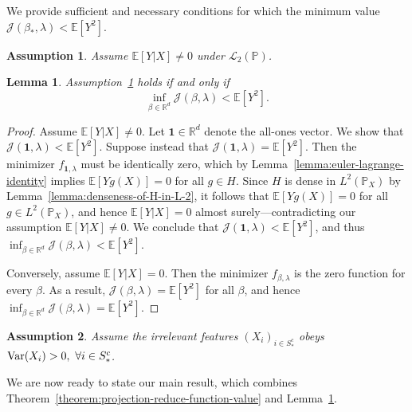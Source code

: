 \documentclass[sn-mathphys-num]{sn-jnl}%
\numberwithin{equation}{section}
\newcommand{\R}{\mathbb{R}}
\newcommand{\E}{\mathbb{E}}
\renewcommand{\P}{\mathbb{P}}
\newtheorem{lemma}{Lemma}
\newtheorem{assumption}{Assumption}[section]
\newcommand{\Var}{{\rm Var}}
\theoremstyle{thmstyleone}%
\theoremstyle{thmstyletwo}%
\theoremstyle{thmstylethree}%
\begin{document}
We provide sufficient and necessary conditions for which the minimum value $\mathcal{J}(\beta_*, \lambda) < \E[Y^2]$. 

\vspace{.5em} 
\begin{assumption}
\label{assumption:for-the-global-minimizer}
Assume $\E[Y|X] \neq 0$ under $\mathcal{L}_2(\P)$.
\end{assumption} 

\vspace{.5em} 
\begin{lemma}
\label{lemma:infimum-nontrivial}
Assumption~\ref{assumption:for-the-global-minimizer} holds if and only if 
\[
	\inf_{\beta \in \R^d} \mathcal{J}(\beta, \lambda) < \E[Y^2].
\] 
\end{lemma} 

\begin{proof}
Assume $\E[Y|X] \ne 0$. Let $\mathbf{1} \in \R^d$ denote the all-ones vector. We show that $\mathcal{J}(\mathbf{1}, \lambda) < \E[Y^2]$. Suppose instead that $\mathcal{J}(\mathbf{1}, \lambda) = \E[Y^2]$. Then the minimizer $f_{\mathbf{1}, \lambda}$ must be identically zero, which by Lemma~\ref{lemma:euler-lagrange-identity} implies $\E[Y g(X)] = 0$ for all $g \in H$. Since $H$ is dense in $L^2(\P_X)$ by Lemma~\ref{lemma:denseness-of-H-in-L-2}, it follows that $\E[Y g(X)] = 0$ for all $g \in L^2(\P_X)$, and hence $\E[Y|X] = 0$ almost surely---contradicting our assumption $\E[Y|X] \ne 0$.
We conclude that $\mathcal{J}(\mathbf{1}, \lambda) < \E[Y^2]$, and thus
$\inf_{\beta \in \R^d} \mathcal{J}(\beta, \lambda) < \E[Y^2]$. 

Conversely, assume $\E[Y|X] = 0$. Then the minimizer $f_{\beta, \lambda}$ is the zero function for every $\beta$. 
As a result, $\mathcal{J}(\beta, \lambda) = \E[Y^2]$ for all $\beta$, and hence 
$\inf_{\beta \in \R^d} \mathcal{J}(\beta, \lambda) = \E[Y^2]$. 
\end{proof} 

\vspace{.5em} 
\begin{assumption}
\label{assumption:mild-assumption}
Assume the irrelevant features $(X_i)_{i \in S_*^c}$ obeys $\Var(X_i) > 0,~\forall i \in S_*^c$. 
\end{assumption}

\vspace{.5em} 
We are now ready to state our main result, which combines 
Theorem~\ref{theorem:projection-reduce-function-value} and Lemma~\ref{lemma:infimum-nontrivial}.  
\end{document}
